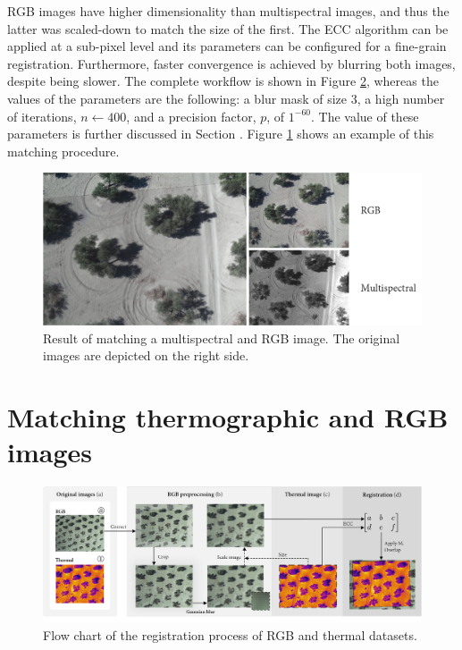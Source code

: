 RGB images have higher dimensionality than multispectral images, and thus the latter was scaled-down to match the size of the first. The ECC algorithm can be applied at a sub-pixel level and its parameters can be configured for a fine-grain registration. Furthermore, faster convergence is achieved by blurring both images, despite being slower. The complete workflow is shown in Figure \ref{fig:thermal_registration}, whereas the values of the parameters are the following: a blur mask of size 3, a high number of iterations, $n \gets 400$, and a precision factor, $p$, of $1^{-60}$. The value of these parameters is further discussed in Section . Figure \ref{fig:rgb_multi_registration_result} shows an example of this matching procedure.

\begin{figure}[ht]
    \centering
    \includegraphics{figs/image_fusion/rgb_multispectral_registration_result.png}
    \caption{Result of matching a multispectral and RGB image. The original images are depicted on the right side.}
    \label{fig:rgb_multi_registration_result}
\end{figure}

\section{Matching thermographic and RGB images}

\begin{figure}
    \includegraphics{figs/image_fusion/thermal_registration.png}
    \caption{Flow chart of the registration process of RGB and thermal datasets.}
    \label{fig:thermal_registration}
\end{figure}

